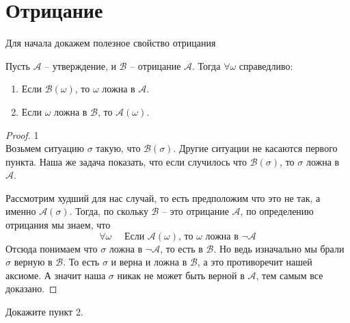 
\section{Отрицание}
Для начала докажем полезное свойство отрицания
\begin{statement}
  Пусть $\mathcal{A}$ -- утверждение, и $\mathcal{B}$ -- отрицание $\mathcal{A}$. Тогда $ \forall \omega $ справедливо: \begin{enumerate}
    \item Если $\mathcal{B}(\omega)$, то $ \omega $ ложна в $\mathcal{A}$.
    \item Если $ \omega $ ложна в $\mathcal{B}$, то $\mathcal{A}(\omega)$.
  \end{enumerate}
\end{statement}
\begin{proof} 1\\
  Возьмем ситуацию $\sigma$ такую, что $\mathcal{B}(\sigma)$. Другие ситуации не касаются первого пункта.
  Наша же задача показать, что если случилось что $ \mathcal{B} (\sigma) $, то $\sigma$ ложна в $\mathcal{A}$.

  Рассмотрим худший для нас случай, то есть предположим что это не так, а именно $ \mathcal{A}(\sigma) $.
  Тогда, по скольку $\mathcal{B}$ -- это отрицание $\mathcal{A}$, по определению отрицания мы знаем, что \[
    \forall \omega \quad \text{ Если } \mathcal{A}(\omega) \text{, то } \omega \text{ ложна в } \neg\mathcal{A} \]
  Отсюда понимаем что $\sigma$ ложна в $ \neg\mathcal{A} $, то есть в $\mathcal{B}$. Но ведь изначально мы брали $\sigma$ верную в $\mathcal{B}$.
  То есть $\sigma$ и верна и ложна в $\mathcal{B}$, а это противоречит нашей аксиоме.
  А значит наша $\sigma$ никак не может быть верной в $\mathcal{A}$, тем самым все доказано.
\end{proof}
\begin{exercise}
  Докажите пункт 2.
\end{exercise}
